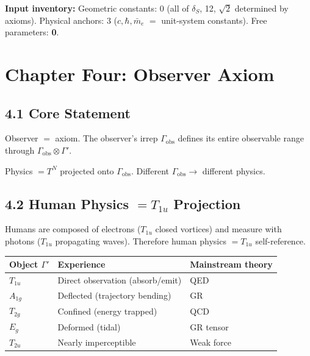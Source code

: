 \documentclass[11pt,a4paper]{article}
\begin{document}
\textbf{Input inventory:} Geometric constants: 0 (all of $\delta_S$, 12, $\sqrt{2}$ determined by axioms). Physical anchors: 3 ($c, \hbar, \bar{m}_e$ $=$ unit-system constants). Free parameters: \textbf{0}.

\section{Chapter Four: Observer Axiom}\label{sec:ch4}

\subsection{4.1 Core Statement}

Observer $=$ axiom. The observer's irrep $\Gamma_{\mathrm{obs}}$ defines its entire observable range through $\Gamma_{\mathrm{obs}}\otimes\Gamma'$.

Physics $= T^N$ projected onto $\Gamma_{\mathrm{obs}}$. Different $\Gamma_{\mathrm{obs}}\to$ different physics.

\subsection{4.2 Human Physics $= T_{1u}$ Projection}

Humans are composed of electrons ($T_{1u}$ closed vortices) and measure with photons ($T_{1u}$ propagating waves). Therefore human physics $= T_{1u}$ self-reference.

\begin{center}
\begin{tabular}{lll}
\toprule
Object $\Gamma'$ & Experience & Mainstream theory \\
\midrule
$T_{1u}$ & Direct observation (absorb/emit) & QED \\
$A_{1g}$ & Deflected (trajectory bending) & GR \\
$T_{2g}$ & Confined (energy trapped) & QCD \\
$E_g$ & Deformed (tidal) & GR tensor \\
$T_{2u}$ & Nearly imperceptible & Weak force \\
\bottomrule
\end{tabular}
\end{center}
\end{document}
